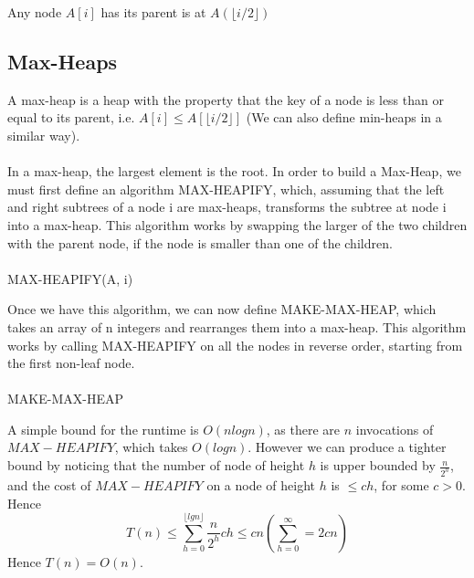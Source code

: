 \documentclass{article}
\begin{document}
        Any node $A[i]$ has its parent is at $A(\lfloor i/2 \rfloor)$
    \subsection{Max-Heaps}
        A max-heap is a heap with the property that the key of a node is less than or equal to its parent, i.e. $A[i] \leq A[\lfloor i / 2 \rfloor]$ (We can also define min-heaps in a similar way). \\ \\
        In a max-heap, the largest element is the root. In order to build a Max-Heap, we must first define an algorithm MAX-HEAPIFY, which, assuming that the left and right subtrees of a node i are max-heaps, transforms the subtree at node i into a max-heap. This algorithm works by swapping the larger of the two children with the parent node, if the node is smaller than one of the children. \\ \\
        MAX-HEAPIFY(A, i)
        \begin{algorithmic}[1]
            \Else
            \EndIf
            \EndIf
            \EndIf
        \end{algorithmic}
        Once we have this algorithm, we can now define MAKE-MAX-HEAP, which takes an array of n integers and rearranges them into a max-heap. This algorithm works by calling MAX-HEAPIFY on all the nodes in reverse order, starting from the first non-leaf node. \\ \\
        MAKE-MAX-HEAP
        \begin{algorithmic}[1]
            \EndFor
        \end{algorithmic}
        A simple bound for the runtime is $O(n log n)$, as there are $n$ invocations of $MAX-HEAPIFY$, which takes $O(log n)$. However we can produce a tighter bound by noticing that the number of node of height $h$ is upper bounded by $\frac{n}{2^h}$, and the cost of $MAX-HEAPIFY$ on a node of height $h$ is $\leq ch$, for some $c > 0$. Hence
        \[ T(n) \leq \sum^{\lfloor lg n \rfloor}_{h = 0} \frac{n}{2^h}ch \leq cn \left( \sum^\infty_{h = 0} = 2cn \right) \]
        Hence $T(n) = O(n)$.
\end{document}

